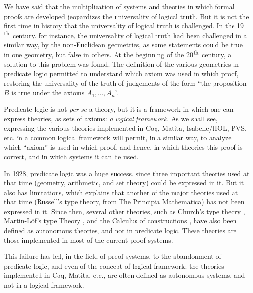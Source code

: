 
We have said that the multiplication of systems and theories in which
formal proofs are developed jeopardizes the universality of logical
truth. But it is not the first time in history that the universality
of logical truth is challenged.  In the 
19$^{\mbox{\footnotesize th}}$ century, for instance,
the universality of logical truth had been challenged in a similar
way, by the non-Euclidean geometries, as some statements could be true
in one geometry, but false in others.  At the beginning of the 20$^{\mbox{\footnotesize th}}$ 
century, a solution to this problem was found.  The definition of the
various geometries in predicate logic \cite{HilbertAckermann}
permitted to understand which axiom was used in which proof, restoring
the universality of the truth of judgements of the form ``the
proposition $B$ is true under the axioms $A_1, ..., A_n$''.

Predicate logic is not {\em per se} a theory, but it is a framework in
which one can express theories, as sets of axioms: {\em a logical
  framework}. As we shall see, expressing the various theories
implemented in Coq, Matita, Isabelle/HOL, PVS, etc.  in a common
logical framework will permit, in a similar way, to analyze which
``axiom'' is used in which proof, and hence, in which theories this
proof is correct, and in which systems it can be used.

In 1928, predicate logic was a huge success, since three important
theories used at that time (geometry, arithmetic, and set theory)
could be expressed in it. But it also has limitations, which explains
that another of the major theories used at that time (Russell's type
theory, from The Principia Mathematica) has not been expressed in
it. Since then, several other theories, such as Church's type theory
\cite{Church40}, Martin-L\"of's type Theory \cite{Martin-Lof84}, and
the Calculus of constructions \cite{CoquandHuet88}, have also been
defined as autonomous theories, and not in predicate logic.  These
theories are those implemented in most of the current proof systems.

This failure has led, in the field of proof systems, to the
abandonment of predicate logic, and even of the concept of logical
framework: the theories implemented in Coq, Matita, etc., are often
defined as autonomous systems, and not in a logical framework.

